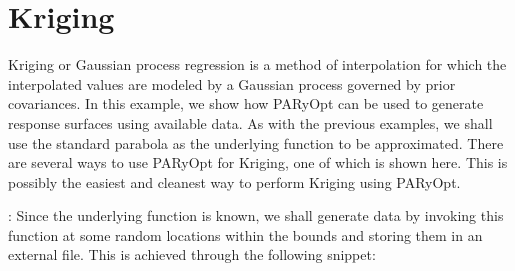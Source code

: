 \documentclass[letterpaper,12pt,english]{sphinxmanual}
\begin{document}
\section{Kriging}
\label{\detokenize{examples/kriging_example:kriging}}\label{\detokenize{examples/kriging_example:example-4}}\label{\detokenize{examples/kriging_example::doc}}
\sphinxAtStartPar
Kriging or Gaussian process regression is a method of interpolation for which the interpolated values are modeled by a
Gaussian process governed by prior covariances. In this example, we show how PARyOpt can be used to generate response
surfaces using available data.
As with the previous examples, we shall use the standard parabola as the underlying function to be approximated. There
are several ways to use PARyOpt for Kriging, one of which is shown here. This is possibly the easiest and cleanest way
to perform Kriging using PARyOpt.

\sphinxAtStartPar
{}: Since the underlying function is known, we shall generate data by invoking this function
at some random locations within the bounds and storing them in an external file. This is achieved through the
following snippet:
\end{document}
